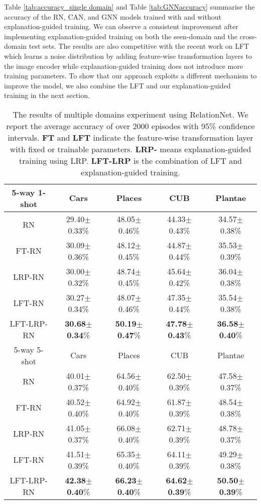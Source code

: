 \documentclass[a4paper,conference]{IEEEtran}
\begin{document}
Table \ref{tab:accuracy_single domain} and Table \ref{tab:GNNaccuracy} summarise the accuracy of the RN, CAN, and GNN models trained with and without explanation-guided training. We can observe a consistent improvement after implementing explanation-guided training on both the seen-domain and the cross-domain test sets. The results are also competitive with the recent work on LFT \cite{FeaturewiseTranslayer:tseng2020cross} which learns a noise distribution by adding feature-wise transformation layers to the image encoder while explanation-guided training does not introduce more training parameters. To show that our approach exploits a different mechanism to improve the model, we also combine the LFT and our explanation-guided training in the next section.

\begin{table*}[tb]
    \centering
\caption{The results of multiple domains experiment using RelationNet. We report the average accuracy of over 2000 episodes with 95\% confidence intervals. \textbf{FT} and \textbf{LFT} indicate the feature-wise transformation layer with fixed or trainable parameters. \textbf{LRP-} means explanation-guided training using LRP. \textbf{LFT-LRP} is the combination of LFT and explanation-guided training.}
    \begin{tabular}{c c c c c}
    \hline
        5-way 1-shot       &  Cars           & Places         & CUB          & Plantae\\ \hline
        RN         & 29.40$\pm$0.33\%  & 48.05$\pm$0.46\% &44.33$\pm$0.43\%& 34.57$\pm$0.38\%\\
        FT-RN      & 30.09$\pm$0.36\%  & 48.12$\pm$0.45\% &44.87$\pm$0.44\%& 35.53$\pm$0.39\%\\
        LRP-RN     & 30.00$\pm$0.32\%  & 48.74$\pm$0.45\% &45.64$\pm$0.42\%& 36.04$\pm$0.38\%\\
        LFT-RN     & 30.27$\pm$0.34\%  & 48.07$\pm$0.46\% &47.35$\pm$0.44\%& 35.54$\pm$0.38\%\\
        LFT-LRP-RN & \textbf{30.68}$\pm$\textbf{0.34}\%  & \textbf{50.19}$\pm$\textbf{0.47}\% &\textbf{47.78}$\pm$\textbf{0.43}\%& \textbf{36.58}$\pm$\textbf{0.40}\%\\ \hline \hline
        5-way 5-shot       &  Cars           & Places         & CUB          & Plantae\\ \hline
        RN         & 40.01$\pm$0.37\%  & 64.56$\pm$0.40\% &62.50$\pm$0.39\%& 47.58$\pm$0.37\%\\
        FT-RN      & 40.52$\pm$0.40\%  & 64.92$\pm$0.40\% &61.87$\pm$0.39\%& 48.54$\pm$0.38\%\\
        LRP-RN     & 41.05$\pm$0.37\%  & 66.08$\pm$0.40\% &62.71$\pm$0.39\%& 48.78$\pm$0.37\%\\
        LFT-RN     & 41.51$\pm$0.39\%  & 65.35$\pm$0.40\% &64.11$\pm$0.39\%& 49.29$\pm$0.38\%\\
        LFT-LRP-RN & \textbf{42.38}$\pm$\textbf{0.40}\%  & \textbf{66.23}$\pm$\textbf{0.40}\% &\textbf{64.62}$\pm$\textbf{0.39}\%& \textbf{50.50}$\pm$\textbf{0.39}\%\\
        \hline
    \end{tabular}
    \label{tab:multi-domain accuracy}
\end{table*}
\end{document}
